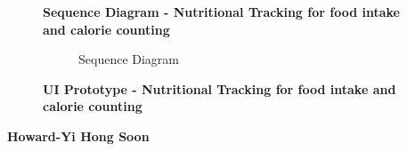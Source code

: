 \documentclass{article}
\begin{document}
		\clearpage

		\begin{figure}[htbp]
			\textbf{Sequence Diagram - Nutritional Tracking for food intake and calorie counting }
			\centering
			\begin{subfigure}{\textwidth}
				{}
				\caption{Sequence Diagram}
			\end{subfigure}
			\begin{subfigure}{\textwidth}
			\end{subfigure}
		\end{figure}
		\clearpage

		\begin{figure}[htbp]
			\textbf{UI Prototype -  Nutritional Tracking for food intake and calorie counting}
			\centering
			\begin{subfigure}{\textwidth}
				\resizebox{\textwidth}{!}{}
			\end{subfigure}
			\begin{subfigure}{\textwidth}
			
			\end{subfigure}
		\end{figure}
		\clearpage

		\textbf{Howard-Yi Hong Soon}
\end{document}
